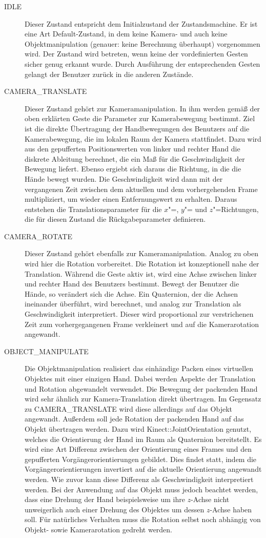 	\begin{description}
		\item[IDLE] Dieser Zustand entspricht dem Initialzustand der Zustandsmachine. Er ist eine Art Default-Zustand, in dem keine Kamera- und auch keine Objektmanipulation (genauer: keine Berechnung überhaupt) vorgenommen wird. Der Zustand wird betreten, wenn keine der vordefinierten Gesten sicher genug erkannt wurde. Durch Ausführung der entsprechenden Gesten gelangt der Benutzer zurück in die anderen Zustände.
		\item[CAMERA\_TRANSLATE] Dieser Zustand gehört zur Kameramanipulation. In ihm werden gemäß der oben erklärten Geste die Parameter zur Kamerabewegung bestimmt. Ziel ist die direkte Übertragung der Handbewegungen des Benutzers auf die Kamerabewegung, die im lokalen Raum der Kamera stattfindet. Dazu wird aus den gepufferten Positionswerten von linker und rechter Hand die diskrete Ableitung berechnet, die ein Maß für die Geschwindigkeit der Bewegung liefert. Ebenso ergiebt sich daraus die Richtung, in die die Hände bewegt wurden. Die Geschwindigkeit wird dann mit der vergangenen Zeit zwischen dem aktuellen und dem vorhergehenden Frame multipliziert, um wieder einen Entfernungswert zu erhalten. Daraus entstehen die Translationsparameter für die $x$"=, $y$"= und $z$"=Richtungen, die für diesen Zustand die Rückgabeparameter definieren.
		\item[CAMERA\_ROTATE] Dieser Zustand gehört ebenfalls zur Kameramanipulation. Analog zu oben wird hier die Rotation vorbereitet. Die Rotation ist konzeptionell nahe der Translation. Während die Geste aktiv ist, wird eine Achse zwischen linker und rechter Hand des Benutzers bestimmt. Bewegt der Benutzer die Hände, so verändert sich die Achse. Ein Quaternion, der die Achsen ineinander überführt, wird berechnet, und analog zur Translation als Geschwindigkeit interpretiert. Dieser wird proportional zur verstrichenen Zeit zum vorhergegangenen Frame verkleinert und auf die Kamerarotation angewandt.
		\item[OBJECT\_MANIPULATE] Die Objektmanipulation realisiert das einhändige Packen eines virtuellen Objektes mit einer einzigen Hand. Dabei werden Aspekte der Translation und Rotation abgewandelt verwendet. Die Bewegung der packenden Hand wird sehr ähnlich zur Kamera-Translation direkt übertragen. Im Gegensatz zu CAMERA\_TRANSLATE wird diese allerdings auf das Objekt angewandt. Außerdem soll jede Rotation der packenden Hand auf das Objekt übertragen werden. Dazu wird Kinect::JointOrientation genutzt, welches die Orientierung der Hand im Raum als Quaternion bereitstellt. Es wird eine Art Differenz zwischen der Orientierung eines Frames und den gepufferten Vorgängerorientierungen gebildet. Dies findet statt, indem die Vorgängerorientierungen invertiert auf die aktuelle Orientierung angewandt werden. Wie zuvor kann diese Differenz als Geschwindigkeit interpretiert werden. Bei der Anwendung auf das Objekt muss jedoch beachtet werden, dass eine Drehung der Hand beispielsweise um ihre $z$-Achse nicht unweigerlich auch einer Drehung des Objektes um dessen $z$-Achse haben soll. Für natürliches Verhalten muss die Rotation selbst noch abhängig von Objekt- sowie Kamerarotation gedreht werden.

\end{description}
